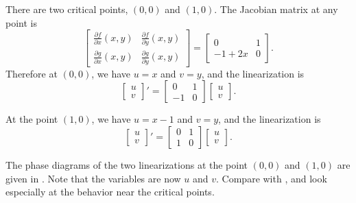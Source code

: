 \documentclass{ximera}
\begin{document}
\begin{exampleSol}
    There are two critical points, $(0,0)$ and $(1,0)$.  The Jacobian matrix at any point is
    \begin{equation*}
        \begin{bmatrix}
            \frac{\partial f}{\partial x}(x,y) & \frac{\partial f}{\partial y}(x,y) \\
            \frac{\partial g}{\partial x}(x,y) & \frac{\partial g}{\partial y}(x,y)
        \end{bmatrix} =
        \begin{bmatrix}
            0 & 1 \\
            -1+2x & 0
        \end{bmatrix}.
    \end{equation*}
    Therefore at $(0,0)$, we have $u=x$ and $v=y$, and the linearization is
    \begin{equation*}
        \begin{bmatrix} 
            u \\ 
            v 
        \end{bmatrix} ' =
        \begin{bmatrix}
            0 & 1 \\
            -1 & 0
        \end{bmatrix}
        \begin{bmatrix} 
            u \\ 
            v 
        \end{bmatrix} .
    \end{equation*}
    
    At the point $(1,0)$, we have $u=x-1$ and $v=y$, and the linearization is
    \begin{equation*}
        \begin{bmatrix} 
            u \\ 
            v 
        \end{bmatrix} ' =
        \begin{bmatrix}
            0 & 1 \\
            1 & 0
        \end{bmatrix}
        \begin{bmatrix} 
            u \\ 
            v 
        \end{bmatrix} .
    \end{equation*}
    
    The phase diagrams of the two linearizations at the point $(0,0)$ and $(1,0)$ are given in .  Note that the variables are now $u$ and $v$.  Compare  with , and look especially at the behavior near the critical points.
    

\end{exampleSol}
\end{document}

